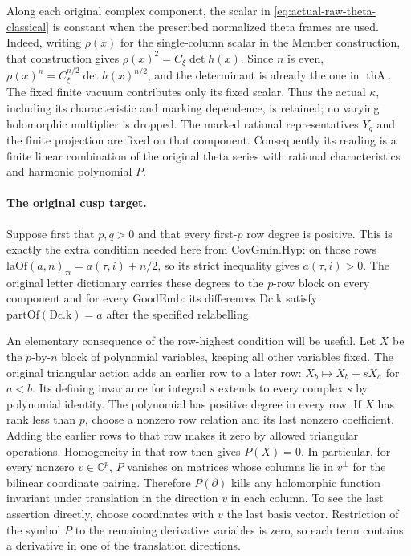 Along each original complex component, the scalar in
\eqref{eq:actual-raw-theta-classical} is constant when the prescribed
normalized theta frames are used.  Indeed, writing $\rho(x)$ for the
single-column scalar in the Member construction, that construction gives
$\rho(x)^2=C_\xi\det h(x)$.  Since $n$ is even,
$\rho(x)^n=C_\xi^{n/2}\det h(x)^{n/2}$, and the determinant is
already the one in $\operatorname{thA}$.
The fixed finite vacuum contributes only its fixed scalar.
Thus the actual $\kappa$, including its characteristic and marking
dependence, is retained; no varying holomorphic multiplier is dropped.
The marked rational representatives $Y_q$ and the finite projection
are fixed on that component.  Consequently its reading is a finite
linear combination of the original theta series with rational
characteristics and harmonic polynomial $P$.

\paragraph{The original cusp target.}
Suppose first that $p,q>0$ and that every first-$p$ row degree is
positive.  This is exactly the extra condition needed here from
$\mathrm{CovGmin.Hyp}$: on those rows
$\mathrm{laOf}(a,n)_{\tau i}=a(\tau,i)+n/2$, so its strict
inequality gives $a(\tau,i)>0$.
The original letter dictionary carries these degrees to the $p$-row
block on every component and for every $\mathrm{GoodEmb}$:
its differences $\mathrm{Dc.k}$ satisfy
$\mathrm{partOf}(\mathrm{Dc.k})=a$ after the specified relabelling.

An elementary consequence of the row-highest condition will be useful.
Let $X$ be the $p$-by-$n$ block of polynomial variables, keeping all
other variables fixed.  The original triangular action adds an earlier
row to a later row: $X_b\mapsto X_b+sX_a$ for $a<b$.
Its defining invariance for integral $s$ extends to every complex $s$
by polynomial identity.  The polynomial has positive degree in every
row.  If $X$ has rank less than $p$, choose a nonzero row relation and
its last nonzero coefficient.  Adding the earlier rows to that row
makes it zero by allowed triangular operations.  Homogeneity in that row
then gives $P(X)=0$.  In particular, for every nonzero $v\in\mathbb C^p$,
$P$ vanishes on matrices whose columns lie in $v^\perp$ for the bilinear
coordinate pairing.  Therefore $P(\partial)$ kills any holomorphic
function invariant under translation in the direction $v$ in each
column.  To see the last assertion directly, choose coordinates with
$v$ the last basis vector.  Restriction of the symbol $P$ to the
remaining derivative variables is zero, so each term contains a
derivative in one of the translation directions.

